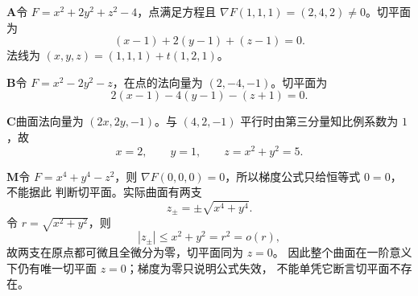 \begin{solutionBox}
\textbf{A}\quad 令 \(F=x^2+2y^2+z^2-4\)，点满足方程且
\(\nabla F(1,1,1)=(2,4,2)\ne0\)。切平面为
\[
(x-1)+2(y-1)+(z-1)=0.
\]
法线为 \((x,y,z)=(1,1,1)+t(1,2,1)\)。

\textbf{B}\quad 令 \(F=x^2-2y^2-z\)，在点的法向量为
\((2,-4,-1)\)。切平面为
\[
2(x-1)-4(y-1)-(z+1)=0.
\]

\textbf{C}\quad 曲面法向量为 \((2x,2y,-1)\)。与
\((4,2,-1)\) 平行时由第三分量知比例系数为 \(1\)，故
\[
x=2,\qquad y=1,\qquad z=x^2+y^2=5.
\]

\textbf{M}\quad 令 \(F=x^4+y^4-z^2\)，则
\(\nabla F(0,0,0)=0\)，所以梯度公式只给恒等式 \(0=0\)，不能据此
判断切平面。实际曲面有两支
\[
z_\pm=\pm\sqrt{x^4+y^4}.
\]
令 \(r=\sqrt{x^2+y^2}\)，则
\[
|z_\pm|\le x^2+y^2=r^2=o(r),
\]
故两支在原点都可微且全微分为零，切平面同为 \(z=0\)。
因此整个曲面在一阶意义下仍有唯一切平面 \(z=0\)；梯度为零只说明公式失效，
不能单凭它断言切平面不存在。
\end{solutionBox}
